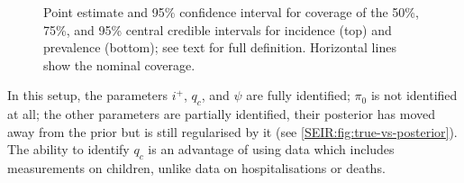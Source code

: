 \documentclass[thesis.tex]{subfiles}
\begin{document}
\begin{figure}
    \vspace{-3cm}
    \caption[Coverage of simulation study (derived quantities)]{%
        Point estimate and 95\% confidence interval for coverage of the 50\%, 75\%, and 95\% central credible intervals for incidence (top) and prevalence (bottom); see text for full definition.
        Horizontal lines show the nominal coverage.
    }
    \label{SEIR:fig:sim-inc-prev}
\end{figure}


In this setup, the parameters $i^+$, $q_c$, and $\psi$ are fully identified; $\pi_0$ is not identified at all; the other parameters are partially identified, their posterior has moved away from the prior but is still regularised by it (see \cref{SEIR:fig:true-vs-posterior}).
The ability to identify $q_c$ is an advantage of using data which includes measurements on children, unlike data on hospitalisations or deaths.
\end{document}
